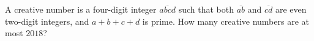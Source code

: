 A creative number is a four-digit integer $\overline{abcd}$ such that both $\overline{ab}$ and $\overline{cd}$ are even two-digit integers, and $a+b+c+d$ is prime. How many creative numbers are at most $2018$?
